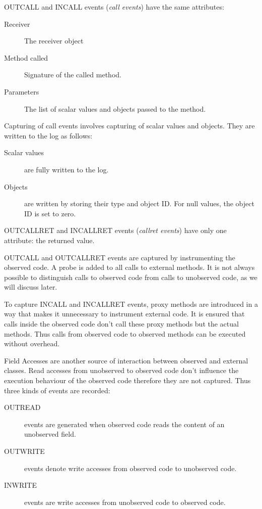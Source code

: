 OUTCALL and INCALL events (\emph {call events})  have the same attributes:

\begin{description}
 \item [Receiver] The receiver object
 \item [Method called] Signature of the called method.
 \item [Parameters] The list of scalar values and objects passed to the method.
\end{description}

Capturing of call events involves capturing of scalar values and objects. They are written to the log as follows:

\begin{description}
 \item [Scalar values] are fully written to the log.
 \item [Objects] are written by storing their type and object ID. For null values, the object ID is set to zero. 
\end{description}

OUTCALLRET and INCALLRET events (\emph{callret events}) have only one attribute: the returned value.

OUTCALL and OUTCALLRET events are captured by instrumenting the observed code. A probe is added to all calls to external methods. It is not always possible to distinguish calls to observed code from calls to unobserved code, as we will discuss later.

To capture INCALL and INCALLRET events, proxy methods are introduced in a way that makes it unnecessary to instrument external code. It is ensured that calls inside the observed code don't call these proxy methods but the actual methods. Thus calls from observed code to observed methods can be executed without overhead.

Field Accesses are another source of interaction between observed and external classes. Read accesses from unobserved to observed code don't influence the execution behaviour of the observed code therefore they are not captured. Thus three kinds of events are recorded:

\begin{description}
 \item [OUTREAD] events are generated when observed code reads the content of an unobserved field.
 \item [OUTWRITE] events denote write accesses from observed code to unobserved code.
 \item [INWRITE] events are write accesses from unobserved code to observed code.
\end{description}

